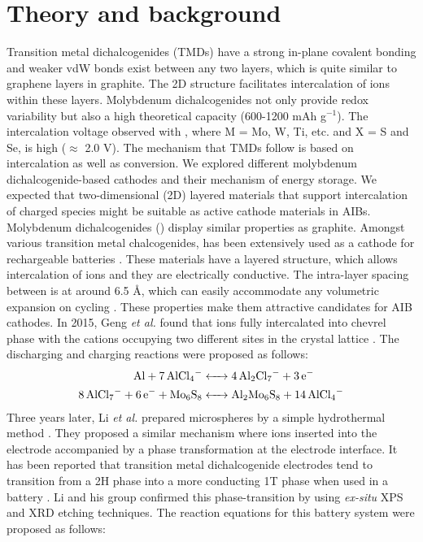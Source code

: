 \section{Theory and background}
Transition metal dichalcogenides (TMDs) have a strong in-plane covalent bonding and weaker vdW bonds exist between any two layers, which is quite similar to graphene layers in graphite. The 2D structure facilitates intercalation of ions within these layers. Molybdenum dichalcogenides not only provide redox variability but also a high theoretical capacity (600-1200 mAh g$^{-1}$). The intercalation voltage observed with , where M = Mo, W, Ti, etc. and X = S and Se, is high ($\approx$ 2.0 V). The mechanism that TMDs follow is based on intercalation as well as conversion. 
We explored different molybdenum dichalcogenide-based cathodes and their mechanism of energy storage. We expected that two-dimensional (2D) layered materials that support intercalation of charged species might be suitable as active cathode materials in AIBs. Molybdenum dichalcogenides () display similar properties as graphite. Amongst various transition metal chalcogenides,  has been extensively used as a cathode for rechargeable batteries \cite{li_rechargeable_2018-2, zhu_fast_2015-2}. These materials have a layered structure, which allows intercalation of ions and they are electrically conductive. The intra-layer spacing between  is at around 6.5 \AA, which can easily accommodate any volumetric expansion on cycling \cite{liang_rechargeable_2011,hu_ws2_2013}. These properties make them attractive candidates for AIB cathodes. In 2015, Geng \textit{et al.} found that  ions fully intercalated into chevrel phase  with the cations occupying two different sites in the crystal lattice \cite{geng_reversible_2015}. The discharging and charging reactions were proposed as follows:
\begin{align*}
          \ce{Al + 7AlCl4^- &<-> 4Al2Cl7^- + 3e^-}\\
\ce{8AlCl7^- + 6e^- + Mo6S8 &<-> Al2Mo6S8 + 14AlCl4^-}
\end{align*}
Three years later, Li \textit{et al.} prepared  microspheres by a simple hydrothermal method \cite{li_rechargeable_2018-2}. They proposed a similar mechanism where  ions inserted into the electrode accompanied by a phase transformation at the electrode interface. It has been reported that transition metal dichalcogenide electrodes tend to transition from a 2H phase into a more conducting 1T phase when used in a battery \cite{fan_hybrid_2017}. Li and his group confirmed this phase-transition by using \textit{ex-situ} XPS and XRD etching techniques. The reaction equations for this battery system were proposed as follows:
